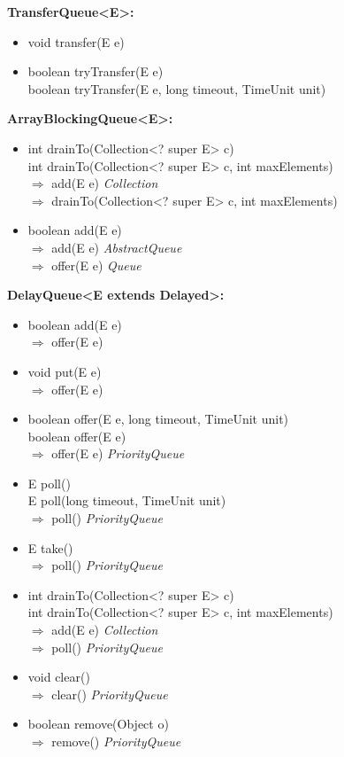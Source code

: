 \documentclass[]{usiinfthesis}
\begin{document}
{\noindent
\textbf{TransferQueue<E>:}
\begin{itemize}
    \item void transfer(E e)
    \item boolean tryTransfer(E e)
    \mbox{}\\ boolean tryTransfer(E e, long timeout, TimeUnit unit)
\end{itemize}

\noindent
\textbf{ArrayBlockingQueue<E>:}
\begin{itemize}
    \item   int drainTo(Collection<? super E> c)
    \mbox{}\\   int drainTo(Collection<? super E> c, int maxElements)
    \mbox{}\\ $\Rightarrow$   add(E e)                \textit{Collection}
    \mbox{}\\ $\Rightarrow$   drainTo(Collection<? super E> c, int maxElements)
    \item   boolean add(E e)
    \mbox{}\\ $\Rightarrow$   add(E e)                \textit{AbstractQueue}
    \mbox{}\\ $\Rightarrow$   offer(E e)        \textit{Queue}
\end{itemize}

\noindent
\textbf{DelayQueue<E extends Delayed>:}
\begin{itemize}
    \item   boolean add(E e)
    \mbox{}\\ $\Rightarrow$   offer(E e)
    \item   void put(E e) 
    \mbox{}\\ $\Rightarrow$   offer(E e)
    \item   boolean offer(E e, long timeout, TimeUnit unit)	
    \mbox{}\\   boolean offer(E e)
    \mbox{}\\ $\Rightarrow$   offer(E e)	\textit{PriorityQueue}
    \item   E poll()
    \mbox{}\\   E poll(long timeout, TimeUnit unit)
    \mbox{}\\ $\Rightarrow$   poll()		\textit{PriorityQueue}
    \item   E take()
    \mbox{}\\ $\Rightarrow$   poll()		\textit{PriorityQueue}
    \item   int drainTo(Collection<? super E> c)
    \mbox{}\\   int drainTo(Collection<? super E> c, int maxElements)
    \mbox{}\\ $\Rightarrow$   add(E e)		\textit{Collection}
    \mbox{}\\ $\Rightarrow$   poll()		\textit{PriorityQueue}
    \item   void clear()
    \mbox{}\\ $\Rightarrow$   clear()		\textit{PriorityQueue}
    \item   boolean remove(Object o)
    \mbox{}\\ $\Rightarrow$   remove()	\textit{PriorityQueue}
\end{itemize}

}
\end{document}
